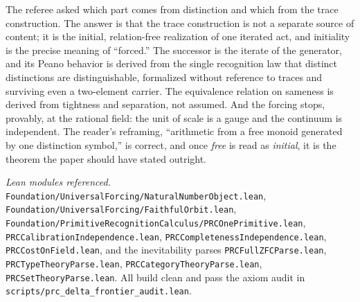\documentclass[11pt,a4paper]{article}
\theoremstyle{definition}
\theoremstyle{remark}
\newcommand{\code}[1]{\texttt{\small #1}}
\begin{document}
The referee asked which part comes from distinction and which from the trace
construction. The answer is that the trace construction is not a separate source
of content; it is the initial, relation-free realization of one iterated act, and
initiality is the precise meaning of ``forced.'' The successor is the iterate of
the generator, and its Peano behavior is derived from the single recognition law
that distinct distinctions are distinguishable, formalized without reference to
traces and surviving even a two-element carrier. The equivalence relation on
sameness is derived from tightness and separation, not assumed. And the forcing
stops, provably, at the rational field: the unit of scale is a gauge and the
continuum is independent. The reader's reframing, ``arithmetic from a free monoid
generated by one distinction symbol,'' is correct, and once \emph{free} is read
as \emph{initial}, it is the theorem the paper should have stated outright.

\bigskip
\noindent\emph{Lean modules referenced.}
\code{Foundation/UniversalForcing/NaturalNumberObject.lean},
\code{Foundation/UniversalForcing/FaithfulOrbit.lean},
\code{Foundation/PrimitiveRecognitionCalculus/PRCOnePrimitive.lean},
\code{PRCCalibrationIndependence.lean},
\code{PRCCompletenessIndependence.lean},
\code{PRCCostOnField.lean}, and the inevitability parses
\code{PRCFullZFCParse.lean}, \code{PRCTypeTheoryParse.lean},
\code{PRCCategoryTheoryParse.lean}, \code{PRCSetTheoryParse.lean}. All build
clean and pass the axiom audit in \code{scripts/prc\_delta\_frontier\_audit.lean}.
\end{document}
